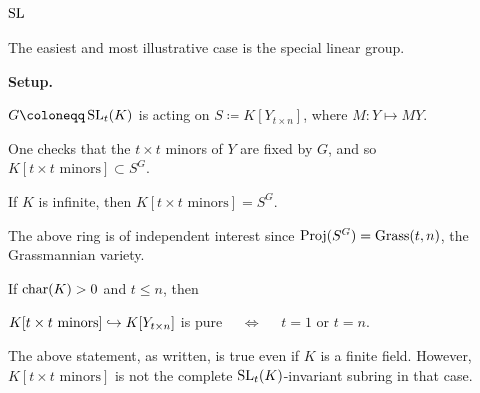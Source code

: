 \documentclass[12pt]{article}
\begin{document}
\section{\texorpdfstring{$\operatorname{SL}$}{SL}}

The easiest and most illustrative case is the special linear group. 

\begin{tcolorbox}[parbox=false]
	\textbf{Setup.} 

	$G \coloneqq \SL_{t}(K)$ is acting on $S \coloneqq K[Y_{t \times n}]$, where $M : Y \mapsto MY$.
\end{tcolorbox}

One checks that the $t \times t$ minors of $Y$ are fixed by $G$, and so $K[\text{$t \times t$ minors}] \subset S^{G}$.

\begin{thm}
	If $K$ is infinite, then $K[\text{$t \times t$ minors}] = S^{G}$.
\end{thm}

The above ring is of independent interest since $\operatorname{Proj}(S^{G}) = \operatorname{Grass}(t, n)$, the Grassmannian variety.

\begin{thm}
	If $\operatorname{char}(K) > 0$ and $t \le n$, then
	\begin{center} 
		$K[\text{$t \times t$ minors}] \hookrightarrow K[Y_{t \times n}]$ is pure $\quad\Leftrightarrow\quad$ $t = 1$ or $t = n$.
	\end{center}
\end{thm}

\begin{rem} \label{rem:theorem-is-for-finite-fields-too}
	The above statement, as written, is true even if $K$ is a finite field. However, $K[\text{$t \times t$ minors}]$ is not the complete $\operatorname{SL}_{t}(K)$-invariant subring in that case.
\end{rem}
\end{document}
